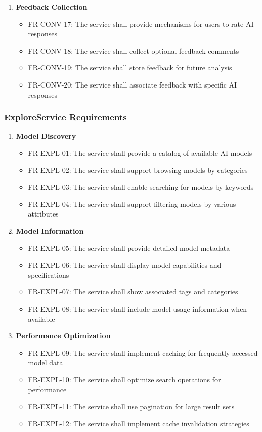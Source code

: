 \begin{enumerate}
   \item \textbf{Feedback Collection}
   \begin{itemize}
      \item FR-CONV-17: The service shall provide mechanisms for users to rate AI responses
      \item FR-CONV-18: The service shall collect optional feedback comments
      \item FR-CONV-19: The service shall store feedback for future analysis
      \item FR-CONV-20: The service shall associate feedback with specific AI responses
   \end{itemize}
\end{enumerate}

\subsubsection*{ExploreService Requirements}

\begin{enumerate}
   \item \textbf{Model Discovery}
   \begin{itemize}
      \item FR-EXPL-01: The service shall provide a catalog of available AI models
      \item FR-EXPL-02: The service shall support browsing models by categories
      \item FR-EXPL-03: The service shall enable searching for models by keywords
      \item FR-EXPL-04: The service shall support filtering models by various attributes
   \end{itemize}

   \item \textbf{Model Information}
   \begin{itemize}
      \item FR-EXPL-05: The service shall provide detailed model metadata
      \item FR-EXPL-06: The service shall display model capabilities and specifications
      \item FR-EXPL-07: The service shall show associated tags and categories
      \item FR-EXPL-08: The service shall include model usage information when available
   \end{itemize}

   \item \textbf{Performance Optimization}
   \begin{itemize}
      \item FR-EXPL-09: The service shall implement caching for frequently accessed model data
      \item FR-EXPL-10: The service shall optimize search operations for performance
      \item FR-EXPL-11: The service shall use pagination for large result sets
      \item FR-EXPL-12: The service shall implement cache invalidation strategies
   \end{itemize}
\end{enumerate}


